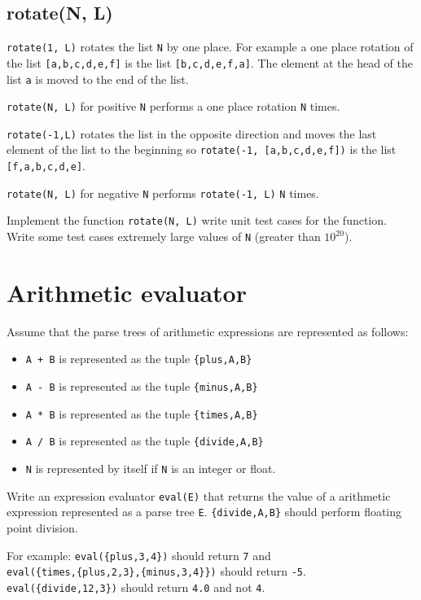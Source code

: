 \documentclass[12pt]{hitec}
\begin{document}
\subsection{rotate(N, L)}

\verb+rotate(1, L)+ rotates the list \verb+N+ by one place.
For example a one place rotation of the list \verb+[a,b,c,d,e,f]+ is the list
\verb+[b,c,d,e,f,a]+. The element at the head of the list \verb+a+ is moved
to the end of the list.

\verb+rotate(N, L)+ for positive \verb+N+ performs a one place rotation \verb+N+ times.

\verb+rotate(-1,L)+ rotates the list in the opposite direction and moves the
last element of the list to the beginning 
so  \verb+rotate(-1, [a,b,c,d,e,f])+ is the list
\verb+[f,a,b,c,d,e]+.

\verb+rotate(N, L)+ for negative \verb+N+ performs \verb+rotate(-1, L)+ \verb+N+ times.

Implement the function \verb+rotate(N, L)+ write unit test cases for the
function. Write some test cases extremely large values
of \verb+N+ (greater than $10^{20}$).

\section{Arithmetic evaluator}

Assume that the parse trees of
arithmetic expressions are represented as follows:

\begin{itemize}
\item \verb=A + B= is represented as the tuple \verb+{plus,A,B}+
\item \verb=A - B= is represented as the tuple \verb+{minus,A,B}+
\item \verb=A * B= is represented as the tuple \verb+{times,A,B}+
\item \verb=A / B= is represented as the tuple \verb+{divide,A,B}+
\item \verb+N+ is represented by itself if \verb+N+ is an integer or float.
\end{itemize}

Write an expression evaluator \verb+eval(E)+ that returns the value of a arithmetic
expression represented as a parse tree \verb+E+. \verb+{divide,A,B}+ should
perform floating point division.

For example:
\verb+eval({plus,3,4})+ should return \verb+7+ and
\\
\verb+eval({times,{plus,2,3},{minus,3,4}})+ should return \verb+-5+.
\\
\verb+eval({divide,12,3})+ should return \verb+4.0+ and not \verb+4+.
\end{document}
